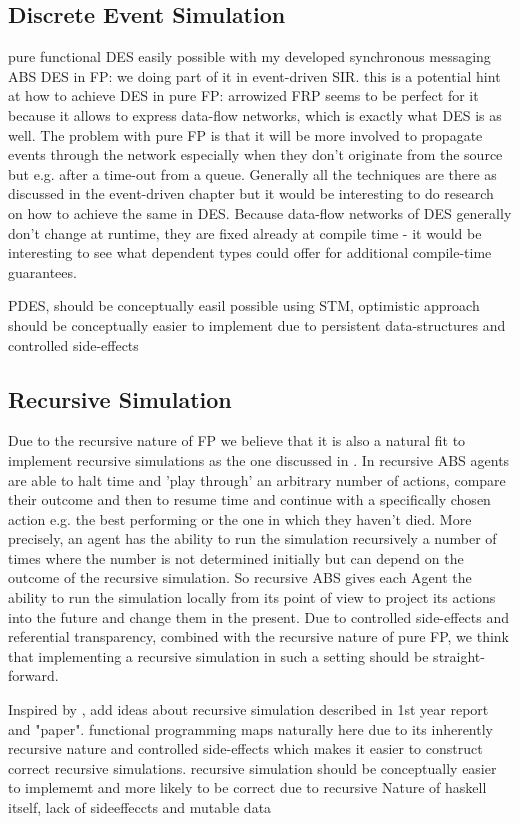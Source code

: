 \subsection{Discrete Event Simulation}
pure functional DES easily possible with my developed synchronous messaging ABS
DES in FP: we doing part of it in event-driven SIR. this is a potential hint at how to achieve DES in pure FP: arrowized FRP seems to be perfect for it because it allows to express data-flow networks, which is exactly what DES is as well. The problem with pure FP is that it will be more involved to propagate events through the network especially when they don't originate from the source but e.g. after a time-out from a queue. Generally all the techniques are there as discussed in the event-driven chapter but it would be interesting to do research on how to achieve the same in DES. Because data-flow networks of DES generally don't change at runtime, they are fixed already at compile time - it would be interesting to see what dependent types could offer for additional compile-time guarantees.

PDES, should be  conceptually easil possible using STM, optimistic approach should be conceptually easier to implement due to persistent data-structures and controlled side-effects
 
\subsection{Recursive Simulation}
Due to the recursive nature of FP we believe that it is also a natural fit to implement recursive simulations as the one discussed in \cite{gilmer_recursive_2000}. In recursive ABS agents are able to halt time and 'play through' an arbitrary number of actions, compare their outcome and then to resume time and continue with a specifically chosen action e.g. the best performing or the one in which they haven't died. More precisely, an agent has the ability to run the simulation recursively a number of times where the number is not determined initially but can depend on the outcome of the recursive simulation. So recursive ABS gives each Agent the ability to run the simulation locally from its point of view to project its actions into the future and change them in the present. Due to controlled side-effects and referential transparency, combined with the recursive nature of pure FP, we think that implementing a recursive simulation in such a setting should be straight-forward.

Inspired by \cite{gilmer_recursive_2000}, add ideas about recursive simulation described in 1st year report and "paper". functional programming maps naturally here due to its inherently recursive nature and controlled side-effects which makes it easier to construct correct recursive simulations.
recursive simulation should be conceptually easier to implememt and more likely to be correct due to recursive Nature of haskell itself, lack of sideeffeccts and mutable data

